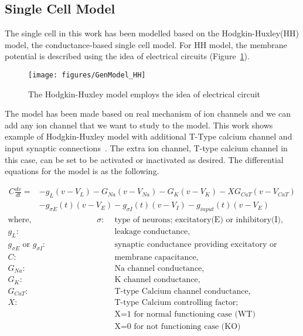 \subsection{Single Cell Model}

The single cell in this work has been modelled based on the Hodgkin-Huxley(HH) model, the conductance-based single cell model. For HH model, the membrane potential is described using the idea of electrical circuits (Figure~\ref{fig:GenModel_HH}). 
\begin{figure}
	\centering
	\texttt{[image: figures/GenModel\_HH]}
	\caption{The Hodgkin-Huxley model employs the idea of electrical circuit}
	\label{fig:GenModel_HH}	
\end{figure}


The model has been made based on real mechanism of ion channels and we can add any ion channel that we want to study to the model. This work shows example of Hodgkin-Huxley model with additional T-Type calcium channel and input synaptic connections~\cite{hodgkin1952quantitative, wang1991model, paik2009spontaneous}. The extra ion channel, T-type calcium channel in this case, can be set to be activated or inactivated as desired. The differential equations for the model is as the following.

\begin{align*}
C\frac{dv}{dt}=&-g_L(v - V_L) - G_{Na}(v - V_{Na}) - G_K(v - V_K) - XG_{CaT}(v - V_{CaT}) \\
&- g_{\sigma E}(t)(v - V_E) - g_{\sigma I}(t)(v - V_I) - g_{input}(t)(v - V_E)
\end{align*}
\begin{align*}
	\text{where,} \hspace{8em} \sigma :& \text{ type of neurons; excitatory(E) or inhibitory(I),} \\
	g_L :& \text{ leakage conductance,} \\
	g_{\sigma E} \text{ or } g_{\sigma I} :& \text{ synaptic conductance providing excitatory or inhibitory input} \\
	C :& \text{ membrane capacitance,}\\
	G_{Na} :& \text{ Na channel conductance,}\\
	G_{K} :& \text{ K channel conductance,}\\
	G_{CaT} :& \text{ T-type Calcium channel conductance,}\\
	X :& \text{ T-type Calcium controlling factor;}\\
	 & \text{ X=1 for normal functioning case (WT) }\\
	 & \text{ X=0 for not functioning case (KO) }\\
\end{align*}

